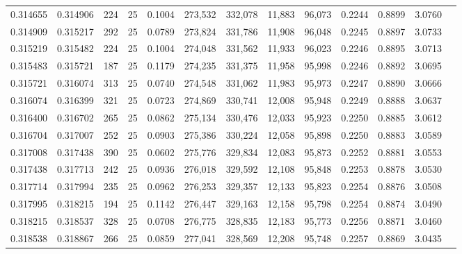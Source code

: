 \begin{tabular}{rrrrrrrrrrrrr}
0.314655 & 0.314906 &   224 &  25 &                                     0.1004 & 273,532 & 332,078 &  11,883 &  96,073 & 0.2244 & 0.8899 & 3.0760 \\
0.314909 & 0.315217 &   292 &  25 &                                     0.0789 & 273,824 & 331,786 &  11,908 &  96,048 & 0.2245 & 0.8897 & 3.0733 \\
0.315219 & 0.315482 &   224 &  25 &                                     0.1004 & 274,048 & 331,562 &  11,933 &  96,023 & 0.2246 & 0.8895 & 3.0713 \\
0.315483 & 0.315721 &   187 &  25 &                                     0.1179 & 274,235 & 331,375 &  11,958 &  95,998 & 0.2246 & 0.8892 & 3.0695 \\
0.315721 & 0.316074 &   313 &  25 &                                     0.0740 & 274,548 & 331,062 &  11,983 &  95,973 & 0.2247 & 0.8890 & 3.0666 \\
0.316074 & 0.316399 &   321 &  25 &                                     0.0723 & 274,869 & 330,741 &  12,008 &  95,948 & 0.2249 & 0.8888 & 3.0637 \\
0.316400 & 0.316702 &   265 &  25 &                                     0.0862 & 275,134 & 330,476 &  12,033 &  95,923 & 0.2250 & 0.8885 & 3.0612 \\
0.316704 & 0.317007 &   252 &  25 &                                     0.0903 & 275,386 & 330,224 &  12,058 &  95,898 & 0.2250 & 0.8883 & 3.0589 \\
0.317008 & 0.317438 &   390 &  25 &                                     0.0602 & 275,776 & 329,834 &  12,083 &  95,873 & 0.2252 & 0.8881 & 3.0553 \\
0.317438 & 0.317713 &   242 &  25 &                                     0.0936 & 276,018 & 329,592 &  12,108 &  95,848 & 0.2253 & 0.8878 & 3.0530 \\
0.317714 & 0.317994 &   235 &  25 &                                     0.0962 & 276,253 & 329,357 &  12,133 &  95,823 & 0.2254 & 0.8876 & 3.0508 \\
0.317995 & 0.318215 &   194 &  25 &                                     0.1142 & 276,447 & 329,163 &  12,158 &  95,798 & 0.2254 & 0.8874 & 3.0490 \\
0.318215 & 0.318537 &   328 &  25 &                                     0.0708 & 276,775 & 328,835 &  12,183 &  95,773 & 0.2256 & 0.8871 & 3.0460 \\
0.318538 & 0.318867 &   266 &  25 &                                     0.0859 & 277,041 & 328,569 &  12,208 &  95,748 & 0.2257 & 0.8869 & 3.0435 \\

\end{tabular}

